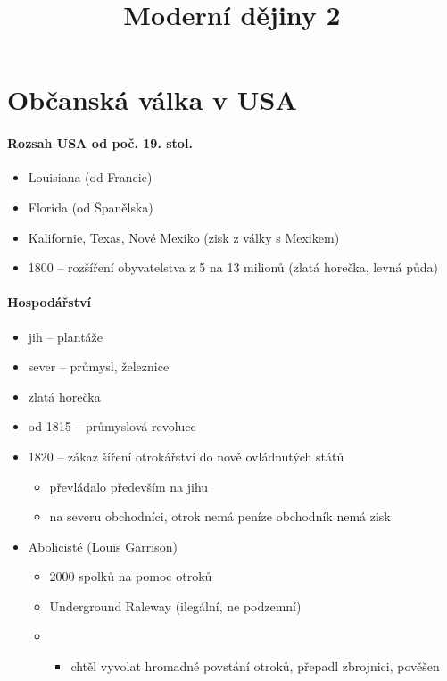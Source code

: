 \title{Moderní dějiny 2}

\newpage

\section{Občanská válka v USA}

\paragraph{Rozsah USA od poč. 19. stol.}
\begin{itemize}
\item Louisiana (od Francie)
\item Florida (od Španělska)
\item Kalifornie, Texas, Nové Mexiko (zisk z války s Mexikem)
\item 1800  -- rozšíření obyvatelstva  z 5 na 13 milionů (zlatá horečka, levná půda)
\end{itemize}

\paragraph{Hospodářství}
\begin{itemize}
\item jih -- plantáže
\item sever -- průmysl, železnice
\item zlatá horečka
\item od 1815 -- průmyslová revoluce
\item 1820 -- zákaz šíření otrokářství do nově ovládnutých států
	\begin{itemize}
	\item převládalo především na jihu
	\item na severu obchodníci, otrok nemá peníze \ra obchodník nemá zisk
	\end{itemize}
\item Abolicisté (Louis Garrison)
	\begin{itemize}
	\item 2000 spolků na pomoc otroků
	\item Underground Raleway (ilegální, ne podzemní)
	\item {}
		\begin{itemize}
		\item chtěl vyvolat hromadné povstání otroků, přepadl zbrojnici, pověšen
		\end{itemize}
	\end{itemize}
\end{itemize}

